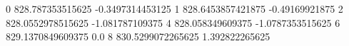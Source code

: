 0 828.787353515625 -0.3497314453125
1 828.6453857421875 -0.49169921875
2 828.0552978515625 -1.081787109375
4 828.058349609375 -1.0787353515625
6 829.1370849609375 0.0
8 830.5299072265625 1.392822265625
